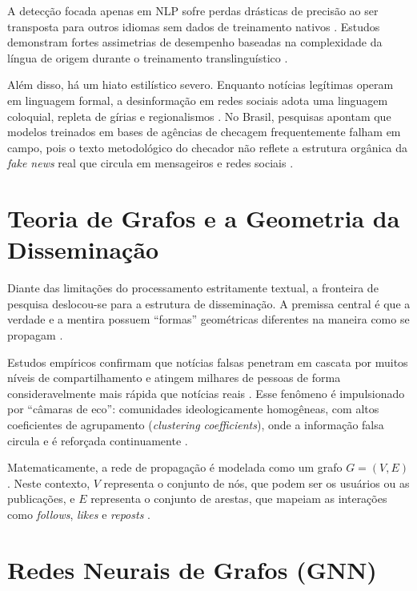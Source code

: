 A detecção focada apenas em NLP sofre perdas drásticas de precisão ao ser transposta para outros idiomas sem dados de treinamento nativos \cite{crosslanguagefakenews}. Estudos demonstram fortes assimetrias de desempenho baseadas na complexidade da língua de origem durante o treinamento translinguístico \cite{crosslanguagefakenews, cogent_nlpmisinformation}.

Além disso, há um hiato estilístico severo. Enquanto notícias legítimas operam em linguagem formal, a desinformação em redes sociais adota uma linguagem coloquial, repleta de gírias e regionalismos \cite{cogent_nlpmisinformation}. No Brasil, pesquisas apontam que modelos treinados em bases de agências de checagem frequentemente falham em campo, pois o texto metodológico do checador não reflete a estrutura orgânica da \textit{fake news} real que circula em mensageiros e redes sociais \cite{ufscar_iabrfakenews, ufc_fakewhatsapp}.

\section{Teoria de Grafos e a Geometria da Disseminação}

Diante das limitações do processamento estritamente textual, a fronteira de pesquisa deslocou-se para a estrutura de disseminação. A premissa central é que a verdade e a mentira possuem ``formas'' geométricas diferentes na maneira como se propagam \cite{pmc_gnnsurveyfakenews, monti2019fakenews}.

Estudos empíricos confirmam que notícias falsas penetram em cascata por muitos níveis de compartilhamento e atingem milhares de pessoas de forma consideravelmente mais rápida que notícias reais \cite{pnasnexus_misinformation, researchgate_temporalgraphs}. Esse fenômeno é impulsionado por ``câmaras de eco'': comunidades ideologicamente homogêneas, com altos coeficientes de agrupamento (\textit{clustering coefficients}), onde a informação falsa circula e é reforçada continuamente \cite{pnasnexus_misinformation}.

Matematicamente, a rede de propagação é modelada como um grafo $G = (V, E)$ \cite{pmc_gnnsurveyfakenews}. Neste contexto, $V$ representa o conjunto de nós, que podem ser os usuários ou as publicações, e $E$ representa o conjunto de arestas, que mapeiam as interações como \textit{follows}, \textit{likes} e \textit{reposts} \cite{pmc_gnnsurveyfakenews, arxiv_topologicalfeatures}.

\section{Redes Neurais de Grafos (GNN)}

